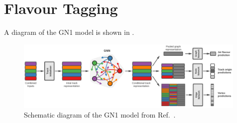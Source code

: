 \section{Flavour Tagging}

A diagram of the GN1 model is shown in .

\begin{figure}
    \centering
    \includegraphics[width=0.99\textwidth]{figures/atlas/gn1.png}
    \caption{Schematic diagram of the GN1 model from Ref.~\cite{GN1}.}
    \label{fig:gn1}
\end{figure}
